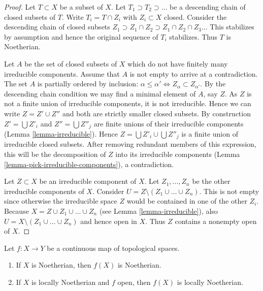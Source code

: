 \begin{proof}
Let $T \subset X$ be a subset of $X$.
Let $T_1 \supset T_2 \supset \ldots$
be a descending chain of closed subsets of $T$.
Write $T_i =  T \cap Z_i$ with $Z_i \subset X$ closed.
Consider the descending chain of closed subsets
$Z_1 \supset Z_1\cap Z_2 \supset Z_1 \cap Z_2 \cap Z_3 \ldots$
This stabilizes by assumption and hence the original sequence
of $T_i$ stabilizes. Thus $T$ is Noetherian.

\medskip\noindent
Let $A$ be the set of closed subsets of $X$ which do not
have finitely many irreducible components. Assume that
$A$ is not empty to arrive at a contradiction.
The set $A$ is partially ordered by inclusion: $\alpha \leq \alpha'
\Leftrightarrow Z_{\alpha} \subset Z_{\alpha'}$.
By the descending chain condition we may find a
minimal element of $A$, say $Z$. As $Z$ is not a finite
union of irreducible components, it is not irreducible.
Hence we can write $Z = Z' \cup Z''$ and both are strictly smaller
closed subsets. By construction $Z' = \bigcup Z'_i$ and
$Z'' = \bigcup Z''_j$ are finite unions of their irreducible
components (Lemma \ref{lemma-irreducible}).
Hence $Z = \bigcup Z'_i \cup \bigcup Z''_j$ is
a finite union of irreducible closed subsets.
After removing redundant members of this expression,
this will be the decomposition of $Z$ into its irreducible
components (Lemma \ref{lemma-pick-irreducible-components}), a contradiction.

\medskip\noindent
Let $Z \subset X$ be an irreducible component of $X$.
Let $Z_1, \ldots, Z_n$ be the other irreducible components
of $X$. Consider $U = Z \setminus (Z_1\cup\ldots\cup Z_n)$.
This is not empty since otherwise the irreducible space
$Z$ would be contained in one of the other $Z_i$.
Because $X = Z \cup Z_1 \cup \ldots \cup Z_n$ (see Lemma \ref{lemma-irreducible}),
also $U = X \setminus (Z_1\cup\ldots\cup Z_n)$
and hence open in $X$. Thus $Z$ contains a nonempty
open of $X$.
\end{proof}

\begin{lemma}
\label{lemma-image-Noetherian}
Let $f : X \to Y$ be a continuous map of topological spaces.
\begin{enumerate}
\item If $X$ is Noetherian, then $f(X)$ is Noetherian.
\item If $X$ is locally Noetherian and $f$ open, then $f(X)$ is
locally Noetherian.
\end{enumerate}
\end{lemma}


